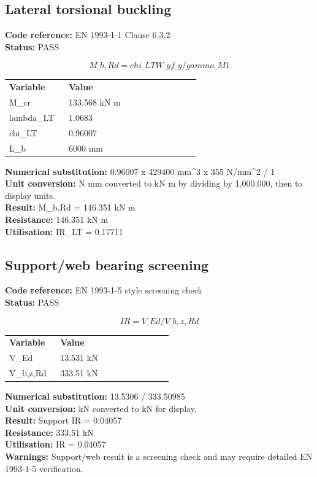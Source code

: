 \documentclass[11pt,a4paper]{article}
\begin{document}
\subsection{Lateral torsional buckling}
\textbf{Code reference:} EN 1993-1-1 Clause 6.3.2\\
\textbf{Status:} PASS

\[
M\_b,Rd = chi\_LT W\_y f\_y / gamma\_M1
\]

\begin{longtable}{p{0.28\linewidth}p{0.62\linewidth}}
\textbf{Variable} & \textbf{Value} \\
M\_cr & 133.568 kN m \\
lambda\_LT & 1.0683 \\
chi\_LT & 0.96007 \\
L\_b & 6000 mm \\
\end{longtable}

\textbf{Numerical substitution:} 0.96007 x 429400 mm\textasciicircum{}3 x 355 N/mm\textasciicircum{}2 / 1\\
\textbf{Unit conversion:} N mm converted to kN m by dividing by 1,000,000, then to display units.\\
\textbf{Result:} M\_b,Rd = 146.351 kN m\\
\textbf{Resistance:} 146.351 kN m\\
\textbf{Utilisation:} IR\_LT = 0.17711\\


\subsection{Support/web bearing screening}
\textbf{Code reference:} EN 1993-1-5 style screening check\\
\textbf{Status:} PASS

\[
IR = V\_Ed / V\_b,z,Rd
\]

\begin{longtable}{p{0.28\linewidth}p{0.62\linewidth}}
\textbf{Variable} & \textbf{Value} \\
V\_Ed & 13.531 kN \\
V\_b,z,Rd & 333.51 kN \\
\end{longtable}

\textbf{Numerical substitution:} 13.5306 / 333.50985\\
\textbf{Unit conversion:} kN converted to kN for display.\\
\textbf{Result:} Support IR = 0.04057\\
\textbf{Resistance:} 333.51 kN\\
\textbf{Utilisation:} IR = 0.04057\\
\textbf{Warnings:} Support/web result is a screening check and may require detailed EN 1993-1-5 verification.
\end{document}

